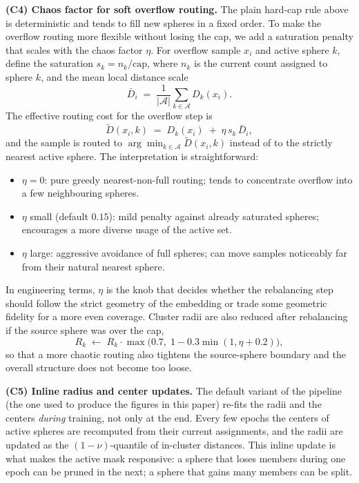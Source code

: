 \documentclass[conference]{IEEEtran}
\begin{document}
\textbf{(C4) Chaos factor for soft overflow routing.}
The plain hard-cap rule above is deterministic and tends to fill new spheres in a fixed order. To make the overflow routing more flexible without losing the cap, we add a saturation penalty that scales with the chaos factor \(\eta\). For overflow sample \(x_{i}\) and active sphere \(k\), define the saturation \(s_{k}=n_{k}/\mathrm{cap}\), where \(n_{k}\) is the current count assigned to sphere \(k\), and the mean local distance scale
\begin{equation}
\bar{D}_{i} \;=\; \frac{1}{|\mathcal{A}|}\sum_{k\in\mathcal{A}} D_{k}(x_{i}).
\label{eq:meanD}
\end{equation}
The effective routing cost for the overflow step is
\begin{equation}
\tilde{D}(x_{i},k) \;=\; D_{k}(x_{i}) \;+\; \eta\,s_{k}\,\bar{D}_{i},
\label{eq:chaos}
\end{equation}
and the sample is routed to \(\arg\min_{k\in\mathcal{A}}\tilde{D}(x_{i},k)\) instead of to the strictly nearest active sphere. The interpretation is straightforward:
\begin{itemize}
    \item \(\eta = 0\): pure greedy nearest-non-full routing; tends to concentrate overflow into a few neighbouring spheres.
    \item \(\eta\) small (default \(0.15\)): mild penalty against already saturated spheres; encourages a more diverse usage of the active set.
    \item \(\eta\) large: aggressive avoidance of full spheres; can move samples noticeably far from their natural nearest sphere.
\end{itemize}
In engineering terms, \(\eta\) is the knob that decides whether the rebalancing step should follow the strict geometry of the embedding or trade some geometric fidelity for a more even coverage. Cluster radii are also reduced after rebalancing if the source sphere was over the cap,
\begin{equation}
R_{k} \;\leftarrow\; R_{k}\cdot\max\bigl(0.7,\;1-0.3\min(1,\eta+0.2)\bigr),
\label{eq:radshrink}
\end{equation}
so that a more chaotic routing also tightens the source-sphere boundary and the overall structure does not become too loose.

\textbf{(C5) Inline radius and center updates.} The default variant of the pipeline (the one used to produce the figures in this paper) re-fits the radii and the centers \emph{during} training, not only at the end. Every few epochs the centers of active spheres are recomputed from their current assignments, and the radii are updated as the \((1-\nu)\)-quantile of in-cluster distances. This inline update is what makes the active mask responsive: a sphere that loses members during one epoch can be pruned in the next; a sphere that gains many members can be split.
\end{document}
